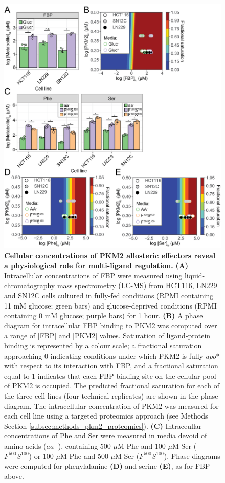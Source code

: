 \begin{figure}[!ht]
\includegraphics[scale=0.6]{ch4_fig10_cellular_lig_conc.png}
\caption[Cellular concentrations of PKM2 allosteric effectors reveal a physiological role for multi-ligand regulation.] {\textbf{Cellular concentrations of PKM2 allosteric effectors reveal a physiological role for multi-ligand regulation.} \textbf{(A)} Intracellular concentrations of FBP were measured using liquid-chromatography mass spectrometry (LC-MS) from HCT116, LN229 and SN12C cells cultured in fully-fed conditions (RPMI containing 11 mM glucose; green bars) and glucose-deprived conditions (RPMI containing 0 mM glucose; purple bars) for 1 hour. \textbf{(B)} A phase diagram for intracellular FBP binding to PKM2 was computed over a range of [FBP] and [PKM2] values. Saturation of ligand-protein binding is represented by a colour scale; a fractional saturation approaching 0 indicating conditions under which PKM2 is fully \textit{apo$\ast$} with respect to its interaction with FBP, and a fractional saturation equal to 1 indicates that each FBP binding site on the cellular pool of PKM2 is occupied. The predicted fractional saturation for each of the three cell lines (four technical replicates) are shown in the phase diagram. The intracellular concentration of PKM2 was measured for each cell line using a targeted proteomics approach (see Methods Section \ref{subsec:methods_pkm2_proteomics}). \textbf{(C)} Intraceullar concentrations of Phe and Ser were measured in media devoid of amino acids ($aa^{-}$), containing 500 $\mu$M Phe and 100 $\mu$M Ser ($F^{500}S^{100}$) or 100 $\mu$M Phe and 500 $\mu$M Ser ($F^{500}S^{100}$). Phase diagrams were computed for phenylalanine \textbf{(D)} and serine \textbf{(E)}, as for FBP above.}
\label{fig:ligand_IC}
\end{figure}
%
%
\clearpage



